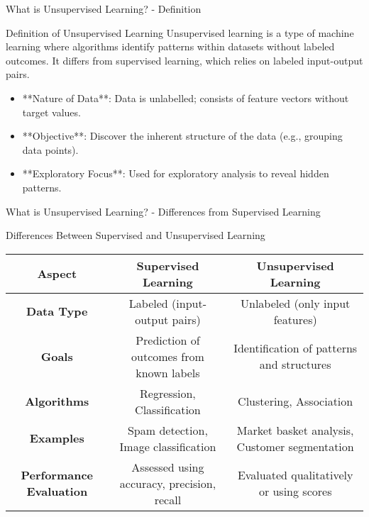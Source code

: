 \documentclass[aspectratio=169]{beamer}
\begin{document}
\begin{frame}[fragile]{What is Unsupervised Learning? - Definition}
    \begin{block}{Definition of Unsupervised Learning}
        Unsupervised learning is a type of machine learning where algorithms identify patterns within datasets 
        without labeled outcomes. It differs from supervised learning, which relies on labeled input-output pairs.
    \end{block}

    \begin{itemize}
        \item **Nature of Data**: Data is unlabelled; consists of feature vectors without target values.
        \item **Objective**: Discover the inherent structure of the data (e.g., grouping data points).
        \item **Exploratory Focus**: Used for exploratory analysis to reveal hidden patterns.
    \end{itemize}
\end{frame}

\begin{frame}[fragile]{What is Unsupervised Learning? - Differences from Supervised Learning}
    \begin{block}{Differences Between Supervised and Unsupervised Learning}
        \begin{tabular}{|c|c|c|}
            \hline
            Aspect & Supervised Learning & Unsupervised Learning \\
            \hline
            \textbf{Data Type} & Labeled (input-output pairs) & Unlabeled (only input features) \\
            \hline
            \textbf{Goals} & Prediction of outcomes from known labels & Identification of patterns and structures \\
            \hline
            \textbf{Algorithms} & Regression, Classification & Clustering, Association \\
            \hline
            \textbf{Examples} & Spam detection, Image classification & Market basket analysis, Customer segmentation \\
            \hline
            \textbf{Performance Evaluation} & Assessed using accuracy, precision, recall & Evaluated qualitatively or using scores \\
            \hline
        \end{tabular}
    \end{block}
\end{frame}
\end{document}
